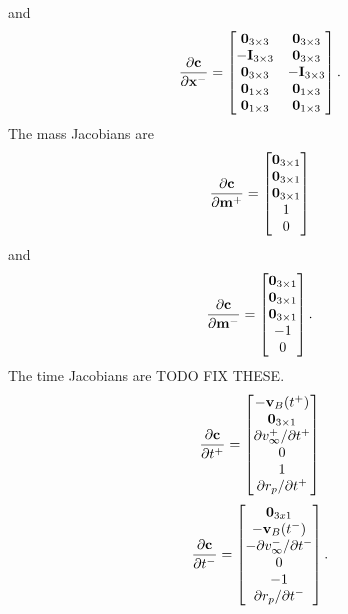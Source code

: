 %
and
%
\begin{equation}
\frac{\partial \mathbf{c}}{\partial \mathbf{x}^-} =
\begin{bmatrix}
   \mathbf{0}_{3 \times 3} & \mathbf{0}_{3 \times 3} \\
   -\mathbf{I}_{3 \times 3} & \mathbf{0}_{3 \times 3}  \\
    \mathbf{0}_{3 \times 3} & -\mathbf{I}_{3 \times 3}   \\
   \mathbf{0}_{1 \times 3} &  \mathbf{0}_{1 \times 3} \\
   \mathbf{0}_{1 \times 3} &  \mathbf{0}_{1 \times 3} \\
\end{bmatrix}.
\end{equation}
%
The mass Jacobians are
%
\begin{equation}
\frac{\partial \mathbf{c}}{\partial \mathbf{m}^+} =
\begin{bmatrix}
   \mathbf{0}_{3 \times 1}  \\
   \mathbf{0}_{3 \times 1}  \\
   \mathbf{0}_{3 \times 1}   \\
   1 \\
   0 \\
\end{bmatrix}
\end{equation}
%
and
%
\begin{equation}
\frac{\partial \mathbf{c}}{\partial \mathbf{m}^-} =
\begin{bmatrix}
   \mathbf{0}_{3 \times 1}  \\
   \mathbf{0}_{3 \times 1}  \\
   \mathbf{0}_{3 \times 1}   \\
   -1 \\
   0 \\
\end{bmatrix}.
\end{equation}
%
The time Jacobians are  TODO FIX THESE.
%
\begin{equation}
\frac{\partial \mathbf{c}}{\partial t^+} =
\begin{bmatrix}
   -\mathbf{v}_{B}(t^+)  \\
   \mathbf{0}_{3 \times 1}   \\
   \partial v_{\infty}^+ / \partial t^+ \\
   0  \\
   1 \\
   \partial r_p / \partial t^+ \\
\end{bmatrix}
\end{equation}
%
\begin{equation}
\frac{\partial \mathbf{c}}{\partial t^-} =
\begin{bmatrix}
   \mathbf{0}_{3x1}  \\
    -\mathbf{v}_{B}(t^-)  \\
   - \partial v_{\infty}^- / \partial t^- \\
   0  \\
   -1 \\
   \partial r_p / \partial t^- \\
\end{bmatrix}.
\end{equation}

